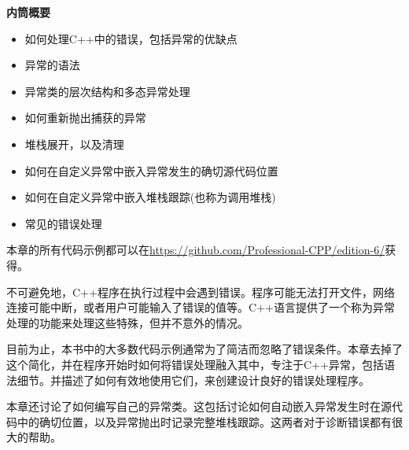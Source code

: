\noindent
\textbf{内筒概要}

\begin{itemize}
\item
如何处理C++中的错误，包括异常的优缺点

\item
异常的语法

\item
异常类的层次结构和多态异常处理

\item
如何重新抛出捕获的异常

\item
堆栈展开，以及清理

\item
如何在自定义异常中嵌入异常发生的确切源代码位置

\item
如何在自定义异常中嵌入堆栈跟踪(也称为调用堆栈)

\item
常见的错误处理
\end{itemize}

本章的所有代码示例都可以在\url{https://github.com/Professional-CPP/edition-6/}获得。

不可避免地，C++程序在执行过程中会遇到错误。程序可能无法打开文件，网络连接可能中断，或者用户可能输入了错误的值等。C++语言提供了一个称为异常处理的功能来处理这些特殊，但并不意外的情况。

目前为止，本书中的大多数代码示例通常为了简洁而忽略了错误条件。本章去掉了这个简化，并在程序开始时如何将错误处理融入其中，专注于C++异常，包括语法细节。并描述了如何有效地使用它们，来创建设计良好的错误处理程序。

本章还讨论了如何编写自己的异常类。这包括讨论如何自动嵌入异常发生时在源代码中的确切位置，以及异常抛出时记录完整堆栈跟踪。这两者对于诊断错误都有很大的帮助。













